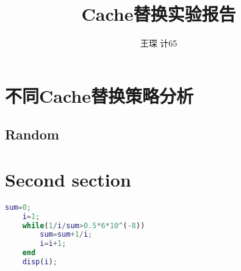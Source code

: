 \documentclass[utf8, hyperref]{article}
\title{\fontsize{18}\baselineskip Cache替换实验报告}
\author{王琛 \quad 计65 \quad 2016011360}
\date{}
\begin{document}
\maketitle
 
\section{不同Cache替换策略分析}
\subsection{Random}

\section{Second section}
\lipsum[5]
\begin{lstlisting}[language=matlab]
    sum=0;
    i=1;
    while(1/i/sum>0.5*6*10^(-8))
        sum=sum+1/i;
        i=i+1; 
    end
    disp(i);
\end{lstlisting}

\lipsum[4]
\end{document}
